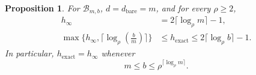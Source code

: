 \documentclass[aps,prl,reprint,notitlepage,nofootinbib,nobibnotes]{revtex4-2}
\newtheorem{proposition}{Proposition}
\begin{document}
\begin{samepage}
\begin{proposition}\label{prop:bacon-shor-saturation}
For $\mathcal B_{m,b}$, $d=d_{\mathrm{bare}}=m$, and for every $\rho\ge2$,
\begin{align}
 h_\infty &= 2\lceil\log_\rho m\rceil-1,
 \label{eq:bacon-shor-onset}\\
 \max\{h_\infty,\lceil\log_\rho(\frac{b}{m})\rceil\}
 &\le h_{\mathrm{exact}}
 \le 2\lceil\log_\rho b\rceil-1.
 \label{eq:bacon-shor-exact-bounds}
\end{align}
In particular, $h_{\mathrm{exact}}=h_\infty$ whenever
\begin{equation}\label{eq:bacon-shor-saturation}
 m\le b\le \rho^{\lceil\log_\rho m\rceil}.
\end{equation}
\end{proposition}
\end{samepage}
\end{document}

